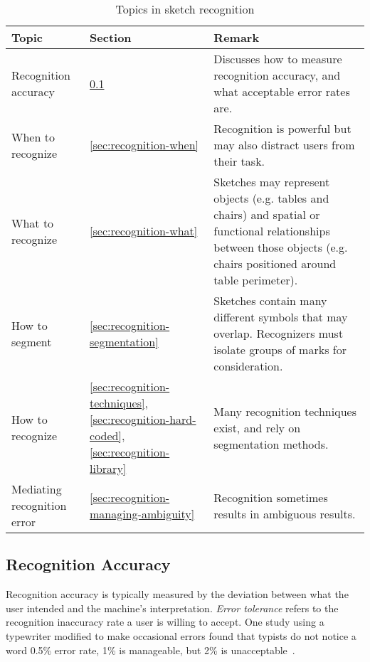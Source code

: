 \begin{table}
\begin{tabular}{p{5cm}| p{2cm} | p{8.5cm}}
\textbf{Topic} & \textbf{Section} & \textbf{Remark} \\
\hline \hline
Recognition accuracy &
\ref{sec:recognition-accuracy} & Discusses how to measure recognition 
accuracy, and what acceptable error rates are.
\\ \hline
When to recognize & 
\ref{sec:recognition-when} &
Recognition is powerful but may also distract users from their
task. 
\\ \hline
What to recognize &
\ref{sec:recognition-what} & Sketches may represent objects
(e.g. tables and chairs) and spatial or functional relationships
between those objects (e.g. chairs positioned around table perimeter).
\\ \hline
How to segment &
\ref{sec:recognition-segmentation} &
Sketches contain many different symbols that may overlap. Recognizers
must isolate groups of marks for consideration.
\\ \hline
How to recognize &

\ref{sec:recognition-techniques}, \ref{sec:recognition-hard-coded},
\ref{sec:recognition-library} &

Many recognition techniques exist, and rely on segmentation
methods. \\ \hline

Mediating recognition error &
\ref{sec:recognition-managing-ambiguity} &
Recognition sometimes results in ambiguous results.
\\ \hline

\end{tabular}
\caption{Topics in sketch recognition}
\label{tab:recognition-topics}
\end{table}

\subsection{Recognition Accuracy}
\label{sec:recognition-accuracy}

Recognition accuracy is typically measured by the deviation between
what the user intended and the machine's interpretation. \textit{Error
  tolerance} refers to the recognition inaccuracy rate a user is
willing to accept. One study using a typewriter modified to make
occasional errors found that typists do not notice a word 0.5\% error
rate, 1\% is manageable, but 2\% is
unacceptable~\cite[p. 79]{cole-survey}. 

